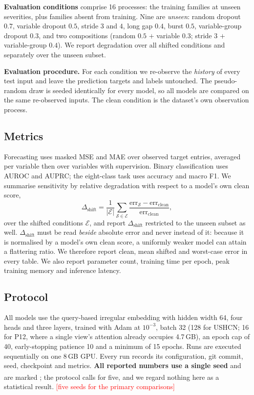 \documentclass[sigconf,nonacm]{acmart}
\newcommand{\todo}[1]{\textcolor{red}{[#1]}}
\newcommand{\prelim}{\textsuperscript{\dag}}
\newcommand{\Sobs}{\mathcal{S}}
\begin{document}
\textbf{Evaluation conditions} comprise 16 processes: the training families at unseen severities, plus families
absent from training. Nine are \emph{unseen}: random dropout $0.7$, variable dropout $0.5$, stride $3$ and $4$,
long gap $0.4$, burst $0.5$, variable-group dropout $0.3$, and two compositions (random $0.5$ $+$ variable
$0.3$; stride $3$ $+$ variable-group $0.4$). We report degradation over all shifted conditions and separately
over the unseen subset.

\textbf{Evaluation procedure.} For each condition we re-observe the \emph{history} of every test input and leave
the prediction targets and labels untouched. The pseudo-random draw is seeded identically for every model, so
all models are compared on the same re-observed inputs. The clean condition is the dataset's own observation
process.

\subsection{Metrics}
Forecasting uses masked MSE and MAE over observed target entries, averaged per variable then over variables with
supervision. Binary classification uses AUROC and AUPRC; the eight-class task uses accuracy and macro F1. We
summarise sensitivity by relative degradation with respect to a model's own clean score,
\begin{equation}
\Delta_{\mathrm{shift}}=\frac{1}{|\mathcal{E}|}\sum_{\Sobs\in\mathcal{E}}
\frac{\mathrm{err}_{\Sobs}-\mathrm{err}_{\mathrm{clean}}}{\mathrm{err}_{\mathrm{clean}}},
\label{eq:degradation}
\end{equation}
over the shifted conditions $\mathcal{E}$, and report $\Delta_{\mathrm{shift}}$ restricted to the unseen subset
as well. $\Delta_{\mathrm{shift}}$ must be read \emph{beside} absolute error and never instead of it: because it
is normalised by a model's own clean score, a uniformly weaker model can attain a flattering ratio. We therefore
report clean, mean shifted and worst-case error in every table. We also report parameter count, training time
per epoch, peak training memory and inference latency.

\subsection{Protocol}
All models use the query-based irregular embedding with hidden width 64, four heads and three layers, trained
with Adam at $10^{-3}$, batch 32 (128 for USHCN; 16 for P12, where a single view's attention already occupies
4.7\,GB), an epoch cap of 40, early-stopping patience 10 and a minimum of 15 epochs. Runs are executed
sequentially on one 8\,GB GPU. Every run records its configuration, git commit, seed, checkpoint and metrics.
\textbf{All reported numbers use a single seed} and are marked \prelim; the protocol calls for five, and we
regard nothing here as a statistical result. \todo{five seeds for the primary comparisons}
\end{document}
